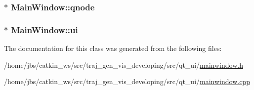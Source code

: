 \subsubsection[{\texorpdfstring{qnode}{qnode}}]{$\ast$ Main\+Window\+::qnode\hspace{0.3cm}{\ttfamily [private]}}\hypertarget{class_main_window_ac9d45be6e40fe6917339119e15c1b120}{}\label{class_main_window_ac9d45be6e40fe6917339119e15c1b120}
\subsubsection[{\texorpdfstring{ui}{ui}}]{$\ast$ Main\+Window\+::ui\hspace{0.3cm}{\ttfamily [private]}}\hypertarget{class_main_window_a35466a70ed47252a0191168126a352a5}{}\label{class_main_window_a35466a70ed47252a0191168126a352a5}


The documentation for this class was generated from the following files\+:\begin{DoxyCompactItemize}
\item 
/home/jbs/catkin\+\_\+ws/src/traj\+\_\+gen\+\_\+vis\+\_\+developing/src/qt\+\_\+ui/\hyperlink{mainwindow_8h}{mainwindow.\+h}\item 
/home/jbs/catkin\+\_\+ws/src/traj\+\_\+gen\+\_\+vis\+\_\+developing/src/qt\+\_\+ui/\hyperlink{mainwindow_8cpp}{mainwindow.\+cpp}\end{DoxyCompactItemize}
